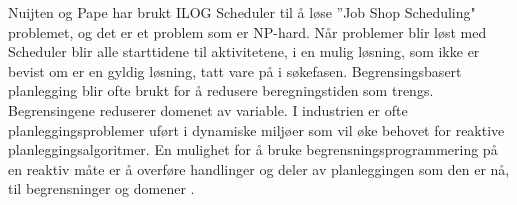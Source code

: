 Nuijten og Pape har brukt ILOG Scheduler til å løse ''Job Shop Scheduling" problemet,  og det er et problem som er NP-hard. Når problemer blir løst med Scheduler blir alle starttidene til aktivitetene, i en mulig løsning, som ikke er bevist om er en gyldig løsning, tatt vare på i søkefasen. Begrensingsbasert planlegging blir ofte brukt for å redusere beregningstiden som trengs. Begrensingene reduserer domenet av variable. I industrien er ofte planleggingsproblemer uført i dynamiske miljøer som vil øke behovet for reaktive planleggingsalgoritmer. En mulighet for å bruke begrensningsprogrammering på en reaktiv måte er å overføre handlinger og deler av planleggingen som den er nå, til begrensninger og domener \cite{Nuijten:1998:CJS:594934.594971}.
